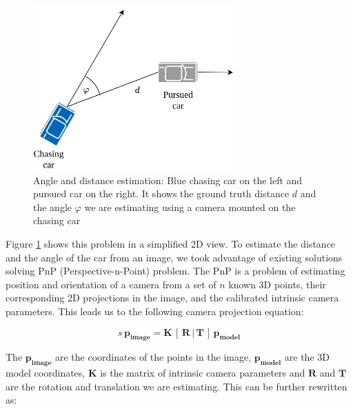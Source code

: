 \documentclass{ctuthesis/ctuthesis}
\begin{document}
\begin{figure}[h!]
    \centering
    \includegraphics[width=0.7\textwidth]{images/ChasingDiagram.png}
    
    \caption{Angle and distance estimation: Blue chasing car on the left and pursued car on the right. It shows the ground truth distance $d$ and the angle $\varphi$ we are estimating using a camera mounted on the chasing car }\label{f:chasing_diagram}
\end{figure}

Figure \ref{f:chasing_diagram} shows this problem in a simplified 2D view. To estimate the distance and the angle of the car from an image, we took advantage of existing solutions solving PnP (Perspective-n-Point) problem. The PnP is a problem of estimating position and orientation of a camera from a set of $n$ known 3D points, their corresponding 2D projections in the image, and the calibrated intrinsic camera parameters. This leads us to the following camera projection equation: \par


\begin{equation}
s\,\mathbf{p_{image}} = \mathbf{K}\,[\,\mathbf{R}\, |\, \mathbf{T}\, ]\, \mathbf{p_{model}}
\end{equation}

The $\mathbf{p_{image}}$ are the coordinates of the points in the image, $\mathbf{p_{model}}$ are the 3D model coordinates, $\mathbf{K}$ is the matrix of intrinsic camera parameters and $\mathbf{R}$ and $\mathbf{T}$ are the rotation and translation we are estimating. This can be further rewritten as: \par
\end{document}
